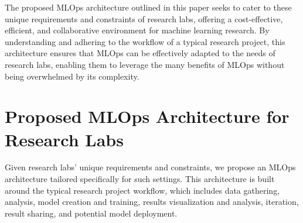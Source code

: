 The proposed MLOps architecture outlined in this paper seeks to cater to these unique requirements and constraints of research labs, offering a cost-effective, efficient, and collaborative environment for machine learning research. By understanding and adhering to the workflow of a typical research project, this architecture ensures that MLOps can be effectively adapted to the needs of research labs, enabling them to leverage the many benefits of MLOps without being overwhelmed by its complexity.


\section{Proposed MLOps Architecture for Research Labs \label{proposed}}
Given research labs' unique requirements and constraints, we propose an MLOps architecture tailored specifically for such settings. This architecture is built around the typical research project workflow, which includes data gathering, analysis, model creation and training, results visualization and analysis, iteration, result sharing, and potential model deployment.

